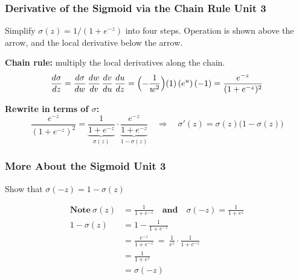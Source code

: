 \documentclass[12pt]{beamer}
\newcommand{\FrameTitle}[2]{\frametitle{#1 \hfill \small\textnormal{\textcolor{midgray}{#2}}}}
\begin{document}
\begin{frame}\FrameTitle{Derivative of the Sigmoid via the Chain Rule}{Unit 3}
    Simplify $\sigma(z) = 1/(1+e^{-z})$ into four steps.
    Operation is shown above the arrow, and the local derivative below the arrow.

    \begin{center}
    \end{center}

    \textbf{Chain rule:} multiply the local derivatives along the chain.
    \[
        \frac{d\sigma}{dz}
        = \frac{d\sigma}{dw}\,\frac{dw}{dv}\,\frac{dv}{du}\,\frac{du}{dz}
        = \Bigl(-\frac{1}{w^{2}}\Bigr)(1)\,(e^{u})\,(-1)
        = \frac{e^{-z}}{(1+e^{-z})^{2}}
    \]

    \textbf{Rewrite in terms of $\sigma$:}
    \[
        \frac{e^{-z}}{(1+e^{-z})^{2}}
        = \underbrace{\frac{1}{1+e^{-z}}}_{\sigma(z)}
          \cdot
          \underbrace{\frac{e^{-z}}{1+e^{-z}}}_{1-\sigma(z)}
        \quad\Longrightarrow\quad
        \boxed{\sigma'(z) = \sigma(z)\bigl(1-\sigma(z)\bigr)}
    \]
\end{frame}

\begin{frame}\FrameTitle{More About the Sigmoid}{Unit 3}
    Show that $\sigma(-z) = 1 - \sigma(z)$

    \begin{align*}
        \textbf{Note} \ \sigma(z) &= \frac{1}{1+e^{-z}} \quad \textbf{and} \quad \sigma(-z) = \frac{1}{1+e^{z}} \\[2mm]
        1 - \sigma(z) &= 1 - \frac{1}{1+e^{-z}} \\[2mm]
                &= \frac{e^{-z}}{1+e^{-z}} \ = \ \frac{1}{e^{z}} \cdot \frac{1}{1+e^{-z}} \\[2mm]
                &= \frac{1}{1+e^{z}} \\[2mm]
                &= \sigma(-z)
    \end{align*}
\end{frame}
\end{document}
